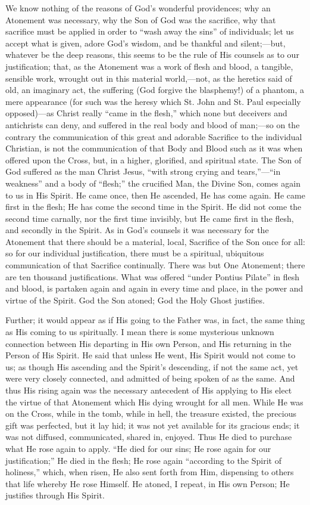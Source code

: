 We know nothing of the reasons of God's wonderful providences; why
an Atonement was necessary, why the Son of God was the sacrifice, why
that sacrifice must be applied in order to ``wash away the
sins'' of individuals; let us accept what is given, adore God's
wisdom, and be thankful and silent;—but, whatever be the deep
reasons, this seems to be the rule of His counsels as to our
justification; that, as the Atonement was a work of flesh and blood, a
tangible, sensible work, wrought out in this material world,—not, as
the heretics said of old, an imaginary act, the suffering (God forgive
the blasphemy!) of a phantom, a mere appearance (for such was the
heresy which St. John and St. Paul especially opposed)—as Christ
really ``came in the flesh,'' which none but deceivers and
antichrists can deny, and suffered in the real body and blood of man;—so
on the contrary the communication of this great and adorable Sacrifice
to the individual Christian, is not the communication of that Body and
Blood such as it was when offered upon the Cross, but, in a higher,
glorified, and spiritual state. The Son of God suffered as the man
Christ Jesus, ``with strong crying and tears,''—``in
weakness'' and a body of ``flesh;'' the crucified Man, the
Divine Son, comes again to us in His Spirit. He came once, then He
ascended, He has come again. He came first in the flesh; He has come
the second time in the Spirit. He did not come the second time
carnally, nor the first time invisibly, but He came first in the
flesh, and secondly in the Spirit. As in God's counsels it was
necessary for the Atonement that there should be a material, local,
Sacrifice of the Son once for all: so for our individual
justification, there must be a spiritual, ubiquitous communication of
that Sacrifice continually. There was but One Atonement; there are ten
thousand justifications. What was offered ``under Pontius
Pilate'' in flesh and blood, is partaken again and again in every
time and place, in the power and virtue of the Spirit. God the
Son atoned; God the Holy Ghost justifies.

Further; it would appear as if His going to the Father was, in
fact, the same thing as His coming to us spiritually. I mean there is
some mysterious unknown connection between His departing in His own
Person, and His returning in the Person of His Spirit. He said that
unless He went, His Spirit would not come to us; as though His
ascending and the Spirit's descending, if not the same act, yet were
very closely connected, and admitted of being spoken of as the same.
And thus His rising again was the necessary antecedent of His applying
to His elect the virtue of that Atonement which His dying wrought for
all men. While He was on the Cross, while in the tomb, while in hell,
the treasure existed, the precious gift was perfected, but it lay hid;
it was not yet available for its gracious ends; it was not diffused,
communicated, shared in, enjoyed. Thus He died to purchase what He
rose again to apply. ``He died for our sins; He rose again for our
justification;'' He died in the flesh; He rose again
``according to the Spirit of holiness,'' which, when risen, He
also sent forth from Him, dispensing to others that life whereby He
rose Himself. He atoned, I repeat, in His own Person; He justifies
through His Spirit.

